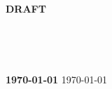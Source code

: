 \begin{titlepage}
\begin{center}
    
    \vfill
    
    
    \if{}
      \vspace{0.5cm}
      \Huge \textbf{DRAFT} \\
    \fi
    
    
    \vspace{0.5cm}


    \ifx\department\undefined
    \else
      \Large \department  \\
    \fi

    \ifx\institution\undefined
    \else
      \Large \institution  \\
    \fi


    \if{}
      \draftdate
      \Large \textbf{\today}
    \else
      \monthyeardate
      \Large \today
    \fi


  \end{center}
\end{titlepage}


